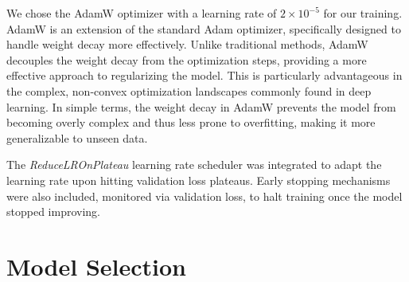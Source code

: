 \documentclass[a4paper,12pt,openright]{book}
\begin{document}
We chose the AdamW optimizer with a learning rate of \(2 \times 10^{-5}\) for our training. AdamW is an extension of the standard Adam optimizer, specifically designed to handle weight decay more effectively. Unlike traditional methods, AdamW decouples the weight decay from the optimization steps, providing a more effective approach to regularizing the model. This is particularly advantageous in the complex, non-convex optimization landscapes commonly found in deep learning. In simple terms, the weight decay in AdamW prevents the model from becoming overly complex and thus less prone to overfitting, making it more generalizable to unseen data. 

The \textit{ReduceLROnPlateau} learning rate scheduler was integrated to adapt the learning rate upon hitting validation loss plateaus. Early stopping mechanisms were also included, monitored via validation loss, to halt training once the model stopped improving.


\section{Model Selection}
\label{model_selection}
\end{document}
